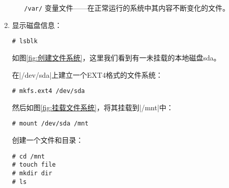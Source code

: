 \documentclass[cs4size,a4paper,nofonts]{ctexart}
\begin{document}
\begin{enumerate}
\begin{itemize}
\item[\tt /var/]   变量文件——在正常运行的系统中其内容不断变化的文件。

\end{itemize}


\item 显示磁盘信息：
\begin{Verbatim}
# lsblk
\end{Verbatim}
如图\ref{fig:创建文件系统}，这里我们看到有一未挂载的本地磁盘sda。

\begin{figure}[htp]
\end{figure}

在|/dev/sda|上建立一个EXT4格式的文件系统：
\begin{Verbatim}
# mkfs.ext4 /dev/sda
\end{Verbatim}


然后如图\ref{fig:挂载文件系统}，将其挂载到|/mnt|中：
\begin{Verbatim}
# mount /dev/sda /mnt
\end{Verbatim}

创建一个文件和目录：
\begin{Verbatim}
# cd /mnt
# touch file
# mkdir dir
# ls
\end{Verbatim}

\begin{figure}[htp]
\end{figure}


\end{enumerate}
\end{document}
